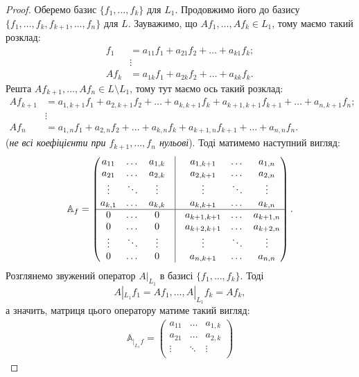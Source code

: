 \documentclass{math_library}
\begin{document}
\begin{proof}
Оберемо базис $\{f_1,\dots, f_k\}$ для $L_1$. Продовжимо його до базису $\{f_1,\dots,f_k,f_{k+1},\dots,f_n\}$ для $L$. Зауважимо, що $Af_1,\dots,Af_k \in L_1$, тому маємо такий розклад:
\begin{align*}
f_1 & = a_{11}f_1 + a_{21}f_2 + \dots + a_{k1}f_k; \\
& \vdots \\
Af_k & = a_{1k}f_1 + a_{2k}f_2 + \dots + a_{kk}f_k.
\end{align*}
Решта $Af_{k+1},\dots,Af_n \in L \setminus L_1$, тому тут маємо ось такий розклад:
\begin{align*}
Af_{k+1} & = a_{1,k+1}f_1 + a_{2,k+1}f_2 + \dots + a_{k,k+1}f_k + a_{k+1,k+1}f_{k+1} + \dots + a_{n,k+1}f_n; \\
& \vdots \\
Af_n & = a_{1,n}f_1 + a_{2,n}f_2 + \dots + a_{k,n}f_k + a_{k+1,n}f_{k+1} + \dots + a_{n,n}f_n.
\end{align*}
(\textit{не всі коефіцієнти при $f_{k+1},\dots,f_n$ нульові}). Тоді матимемо наступний вигляд:
\[
\mathbb{A}_f = \begin{pmatrix}
a_{11} & \dots & a_{1,k} & \vline & a_{1,k+1} & \dots & a_{1, n} \\
a_{21} & \dots & a_{2,k} & \vline & a_{2,k+1} & \dots & a_{2, n} \\
\vdots & \ddots & \vdots & \vline & \vdots & \ddots & \vdots \\
a_{k,1} & \dots & a_{k,k} & \vline & a_{k,k+1} & \dots & a_{k, n} \\
\hline
0 & \dots & 0 & \vline & a_{k+1,k+1} & \dots & a_{k+1, n} \\
0 & \dots & 0 & \vline & a_{k+2,k+1} &  \dots & a_{k+2, n} \\
\vdots & \ddots & \vdots & \vline & \vdots & \ddots & \vdots \\
0 & \dots & 0 & \vline & a_{n,k+1} & \dots & a_{n, n} \\
\end{pmatrix}.
\]
Розглянемо звужений оператор $A|_{L_1}$ в базисі $\{f_1,\dots,f_k\}$. Тоді
\[
 A|_{L_1} f_1 = Af_1 , \dots, A|_{L_1}f_k = Af_k,
 \]
а значить, матриця цього оператору матиме такий вигляд:
\begin{align*}
\mathbb{A}_{|_{L_1}f} = \begin{pmatrix}
a_{11} & \dots & a_{1,k}\\
a_{21} & \dots & a_{2,k}\\
\vdots & \ddots & \vdots\\

\end{pmatrix}
\end{align*}
\end{proof}
\end{document}
